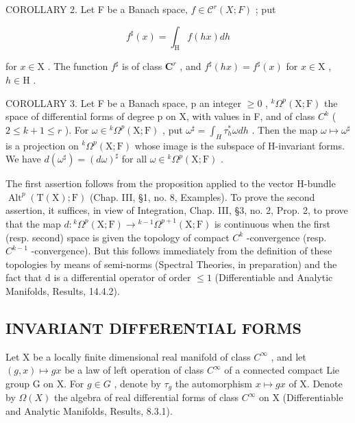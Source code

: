 COROLLARY 2. Let F be a Banach space, \(f \in \mathcal{C}^{r}(X;F)\) ; put

\[
f ^ {\sharp} (x) = \int_ {\mathrm{H}} f (h x) d h
\]

for \(x \in \mathrm{X}\) . The function \(f^{\sharp}\) is of class \(\mathbf{C}^r\) , and \(f^{\sharp}(hx) = f^{\sharp}(x)\) for \(x \in \mathrm{X}\) , \(h \in \mathrm{H}\) .

COROLLARY 3. Let F be a Banach space, p an integer \(\geq 0\) , \(^{k}\Omega^{p}(\mathrm{X};\mathrm{F})\) the space of differential forms of degree p on X, with values in F, and of class \(C^{k}\) ( \(2 \leq k + 1 \leq r\) ). For \(\omega \in {}^{k}\Omega^{p}(\mathrm{X};\mathrm{F})\) , put \(\omega^{\sharp} = \int_{H} \tau_{h}^{*}\omega dh\) . Then the map \(\omega \mapsto \omega^{\sharp}\) is a projection on \(^{k}\Omega^{p}(\mathrm{X};\mathrm{F})\) whose image is the subspace of H-invariant forms. We have \(d(\omega^{\sharp}) = (d\omega)^{\sharp}\) for all \(\omega \in {}^{k}\Omega^{p}(\mathrm{X};\mathrm{F})\) .

The first assertion follows from the proposition applied to the vector H-bundle \(\operatorname{Alt}^{p}(\mathrm{T}(\mathrm{X});\mathrm{F})\) (Chap. III, §1, no. 8, Examples). To prove the second assertion, it suffices, in view of Integration, Chap. III, §3, no. 2, Prop. 2, to prove that the map \(d:{}^{k}\varOmega^{p}(\mathrm{X};\mathrm{F})\to{}^{k-1}\varOmega^{p+1}(\mathrm{X};\mathrm{F})\) is continuous when the first (resp. second) space is given the topology of compact \(C^{k}\) -convergence (resp. \(C^{k-1}\) -convergence). But this follows immediately from the definition of these topologies by means of semi-norms (Spectral Theories, in preparation) and the fact that d is a differential operator of order \(\leq 1\) (Differentiable and Analytic Manifolds, Results, 14.4.2).

\subsection{INVARIANT DIFFERENTIAL FORMS}

Let X be a locally finite dimensional real manifold of class \(C^{\infty}\) , and let \((g, x) \mapsto gx\) be a law of left operation of class \(C^{\infty}\) of a connected compact Lie group G on X. For \(g \in G\) , denote by \(\tau_{g}\) the automorphism \(x \mapsto gx\) of X. Denote by \(\Omega(X)\) the algebra of real differential forms of class \(C^{\infty}\) on X (Differentiable and Analytic Manifolds, Results, 8.3.1).

